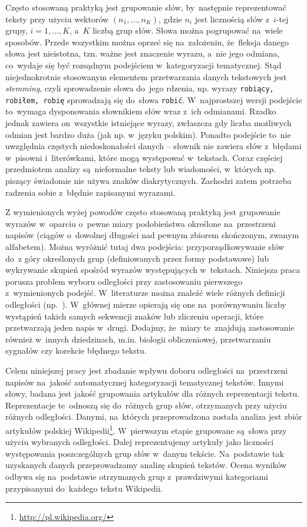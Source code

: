 \documentclass{praca1}
\begin{document}
Często stosowaną praktyką jest grupowanie słów, by~następnie reprezentować teksty przy użyciu wektorów $(n_1,\ldots, n_K)$, gdzie $n_i$ jest licznością słów z~$i$-tej grupy, $i = 1,\ldots,K$, a~$K$ liczbą grup słów. Słowa można pogrupować na~wiele sposobów. Przede wszystkim można oprzeć się na~założeniu, że~fleksja danego słowa jest nieistotna, tzn. ważne jest znaczenie wyrazu, a~nie jego odmiana, co~wydaje się być rozsądnym podejściem w~kategoryzacji tematycznej. Stąd niejednokrotnie stosowanym elementem przetwarzania danych tekstowych jest \emph{stemming}, czyli sprowadzenie słowa do~jego rdzenia, np. wyrazy \verb|robiący, robiłem, robię| sprowadzają się do~słowa \verb|robić|. W~najprostszej wersji podejście to~wymaga dysponowania słownikiem słów wraz z~ich odmianami. Rzadko jednak zawiera on~wszystkie istniejące wyrazy, zwłaszcza gdy liczba możliwych odmian jest bardzo duża (jak np. w~języku polskim). Ponadto podejście to~nie uwzględnia częstych niedoskonałości danych -- słownik nie zawiera słów z~błędami w~pisowni i~literówkami, które mogą występować w~tekstach. Coraz częściej przedmiotem analizy są~nieformalne teksty lub wiadomości, w~których np. piszący świadomie nie używa znaków diakrytycznych. Zachodzi zatem potrzeba radzenia sobie z~błędnie zapisanymi wyrazami. 

Z wymienionych wyżej powodów często stosowaną praktyką jest grupowanie wyrazów w~oparciu o~pewne miary podobieństwa określone na~przestrzeni napisów (ciągów o~dowolnej długości nad pewnym zbiorem skończonym, zwanym alfabetem). Można wyróżnić tutaj dwa podejścia: przyporządkowywanie słów do~z góry określonych grup (definiowanych przez formy podstawowe) lub wykrywanie skupień spośród wyrazów występujących w~tekstach. Niniejsza praca porusza problem wyboru odległości przy zastosowaniu pierwszego z~wymienionych podejść. W~literaturze można znaleźć wiele różnych definicji odległości (np.~\cite{Levenshtein1965:binarycodes, Boytsov2011:indexingmethods, Navarro2001:guidedtour}). W~głównej mierze opierają się one na~porównywaniu liczby wystąpień takich samych sekwencji znaków lub zliczeniu operacji, które przetwarzają jeden napis w~drugi. Dodajmy, że~miary te~znajdują zastosowanie również w~innych dziedzinach, m.in. biologii obliczeniowej, przetwarzaniu sygnałów czy korekcie błędnego tekstu.


Celem niniejszej pracy jest zbadanie wpływu doboru odległości na~przestrzeni napisów na~jakość automatycznej kategoryzacji tematycznej tekstów. Innymi słowy, badana jest jakość grupowania artykułów dla różnych reprezentacji tekstu. Reprezentacje te~odnoszą się do~różnych grup słów, otrzymanych przy użyciu różnych odległości. Danymi, na~których przeprowadzona została analiza jest zbiór artykułów polskiej Wikipedii\footnote{\url{http://pl.wikipedia.org/}}. W~pierwszym etapie grupowane są~słowa przy użyciu wybranych odległości. Dalej reprezentujemy artykuły jako liczności występowania poszczególnych grup słów w~danym tekście. Na~podstawie tak uzyskanych danych przeprowadzamy analizę skupień tekstów. Ocena wyników odbywa się na~podstawie otrzymanych grup z~prawdziwymi kategoriami przypisanymi do~każdego tekstu Wikipedii.
\end{document}
